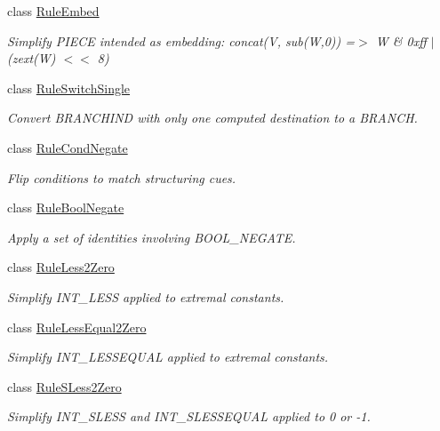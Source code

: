 \begin{DoxyCompactItemize}
class \mbox{\hyperlink{class_rule_embed}{Rule\+Embed}}
\begin{DoxyCompactList}\small\item\em Simplify P\+I\+E\+CE intended as embedding\+: {\ttfamily concat(\+V, sub(\+W,0)) =$>$ W \& 0xff $\vert$ (zext(\+W) $<$$<$ 8)} \end{DoxyCompactList}\item 
class \mbox{\hyperlink{class_rule_switch_single}{Rule\+Switch\+Single}}
\begin{DoxyCompactList}\small\item\em Convert B\+R\+A\+N\+C\+H\+I\+ND with only one computed destination to a B\+R\+A\+N\+CH. \end{DoxyCompactList}\item 
class \mbox{\hyperlink{class_rule_cond_negate}{Rule\+Cond\+Negate}}
\begin{DoxyCompactList}\small\item\em Flip conditions to match structuring cues. \end{DoxyCompactList}\item 
class \mbox{\hyperlink{class_rule_bool_negate}{Rule\+Bool\+Negate}}
\begin{DoxyCompactList}\small\item\em Apply a set of identities involving B\+O\+O\+L\+\_\+\+N\+E\+G\+A\+TE. \end{DoxyCompactList}\item 
class \mbox{\hyperlink{class_rule_less2_zero}{Rule\+Less2\+Zero}}
\begin{DoxyCompactList}\small\item\em Simplify I\+N\+T\+\_\+\+L\+E\+SS applied to extremal constants. \end{DoxyCompactList}\item 
class \mbox{\hyperlink{class_rule_less_equal2_zero}{Rule\+Less\+Equal2\+Zero}}
\begin{DoxyCompactList}\small\item\em Simplify I\+N\+T\+\_\+\+L\+E\+S\+S\+E\+Q\+U\+AL applied to extremal constants. \end{DoxyCompactList}\item 
class \mbox{\hyperlink{class_rule_s_less2_zero}{Rule\+S\+Less2\+Zero}}
\begin{DoxyCompactList}\small\item\em Simplify I\+N\+T\+\_\+\+S\+L\+E\+SS and I\+N\+T\+\_\+\+S\+L\+E\+S\+S\+E\+Q\+U\+AL applied to 0 or -\/1. \end{DoxyCompactList}\item 

\end{DoxyCompactItemize}

